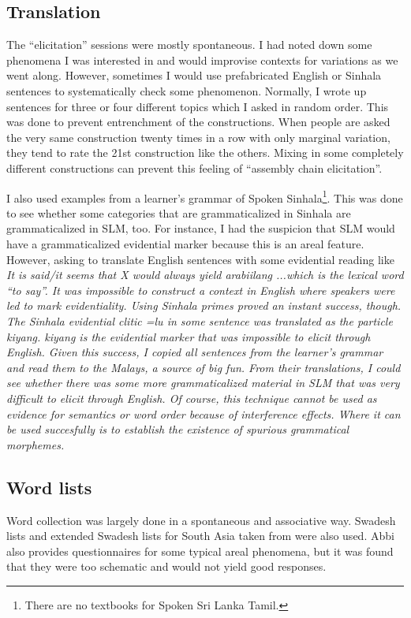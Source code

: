 \subsection{Translation}
The ``elicitation'' sessions were mostly spontaneous. I had noted down some phenomena I was interested  in and would improvise contexts for variations as we went along. However, sometimes I would use prefabricated English or Sinhala sentences to systematically check some phenomenon. 
Normally, I wrote up sentences for three or four different topics which I asked in random order. This was done to prevent entrenchment of the constructions. When people are asked the very same construction twenty times in a row with only marginal variation, they tend to rate the 21st construction like the others. Mixing in some completely different constructions can prevent this feeling of ``assembly chain elicitation''.

I also used examples from a learner's grammar of Spoken Sinhala\footnote{There are no textbooks for Spoken Sri Lanka Tamil.}\citep{Karunatillake2004}. This was done to see whether some categories that are grammaticalized in Sinhala are grammaticalized in SLM, too. For instance, I had the suspicion that SLM would have a grammaticalized evidential marker because this is an areal feature. However, asking to translate English sentences with some evidential reading like \em It is said/it seems that X \em would always yield \em arabiilang ...\em which is the lexical word ``to say''. It was impossible to construct a context in English where speakers were led to mark evidentiality. Using Sinhala primes proved an instant success, though. The Sinhala evidential clitic \em =lu \em in some sentence was translated as the particle \em kiyang\em. \em kiyang \em is the evidential marker that was impossible to elicit through English. Given this success, I copied all sentences from the learner's grammar and read them to the Malays, a source of big fun. From their translations, I could see whether there was some more grammaticalized material in SLM that was very difficult to elicit through English. Of course, this technique cannot be used as evidence for semantics or word order because of interference effects. Where it can be used succesfully is to establish the existence of spurious grammatical morphemes.


\subsection{Word lists}
Word collection was largely done in a spontaneous and associative way. Swadesh lists and extended Swadesh lists for South Asia taken from \citet{Abbi2001} were also used. Abbi also provides questionnaires for some typical areal phenomena, but it was found that they were too schematic and would not yield good responses.

